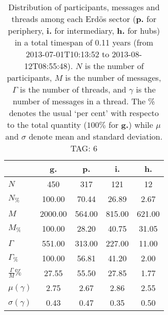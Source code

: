 \begin{table}[h!]
\begin{center}
\begin{tabular}{| l | c | c | c | c |}\hline
 & g. & p. & i. & h. \\\hline
$N$ & 450  & 317  & 121  & 12 \\\hline
$N_{\%}$ & 100.00  & 70.44  & 26.89  & 2.67 \\\hline
$M$ & 2000.00  & 564.00  & 815.00  & 621.00 \\\hline
$M_{\%}$ & 100.00  & 28.20  & 40.75  & 31.05 \\\hline
$\Gamma$ & 551.00  & 313.00  & 227.00  & 11.00 \\\hline
$\Gamma_{\%}$ & 100.00  & 56.81  & 41.20  & 2.00 \\\hline
$\frac{\Gamma}{M}\%$ & 27.55  & 55.50  & 27.85  & 1.77 \\\hline
$\mu(\gamma)$ & 2.75  & 2.67  & 2.86  & 2.55 \\\hline
$\sigma(\gamma)$ & 0.43  & 0.47  & 0.35  & 0.50 \\\hline
\end{tabular}
\caption{Distribution of participants, messages and threads among each Erd\"os sector ({\bf p.} for periphery, {\bf i.} for intermediary, 
    {\bf h.} for hubs) in a total timespan of 0.11 years (from 2013-07-01T10:13:52 to 2013-08-12T08:55:48). $N$ is the number of participants, $M$ is the number of messages, $\Gamma$ is the number of threads, and $\gamma$ is the number of messages in a thread.
    The \% denotes the usual `per cent' with respecto to the total quantity ($100\%$ for {\bf g.})
    while $\mu$ and $\sigma$ denote mean and standard deviation. TAG: 6}
\end{center}
\end{table}